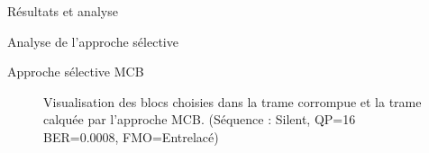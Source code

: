 \begin{chapter}{Résultats et analyse}
\begin{section}{Analyse de l'approche sélective}
\begin{subsection}{Approche sélective MCB}
\begin{figure}[htb]
{\begin{varwidth}{\textwidth}
{\label{fig-ChoiceFcInter}
}
\end{varwidth}} 
\caption[Blocs choisies dans la trame corrompue et la trame calquée par
l'approche MCB (entrelacé)]{Visualisation des blocs choisies dans la trame
corrompue et la trame calquée par l'approche MCB. (Séquence : Silent, QP=16
BER=0.0008, FMO=Entrelacé)}
\label{fig-SilentBlockSel}
\end{figure}


\end{subsection}
\end{section}
\end{chapter}
